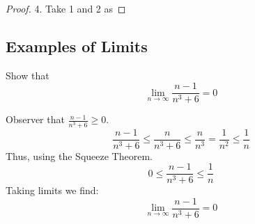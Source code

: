 \documentclass[a4paper, notitlepage]{report}
\theoremstyle{remark}
\theoremstyle{definition}
\begin{document}
        \begin{proof}
            4. Take 1 and 2 as 
        \end{proof}

        \subsection{Examples of Limits}
        Show that \[\lim_{n\to\infty} \frac{n-1}{n^3 +6} = 0\]

        Observer that \(\frac{n-1}{n^3+6} \geq 0\).
        \[\frac{n-1}{n^3 + 6} \leq \frac{n}{n^3+6} \leq \frac{n}{n^3} = \frac{1}{n^2} \leq \frac{1}{n}\]
        Thus, using the Squeeze Theorem.
        \[0 \leq \frac{n-1}{n^3 +6} \leq \frac{1}{n}\]
        Taking limits we find:
        \[
            \lim_{n\to\infty} \frac{n-1}{n^3 +6} = 0
        \]
\end{document}
